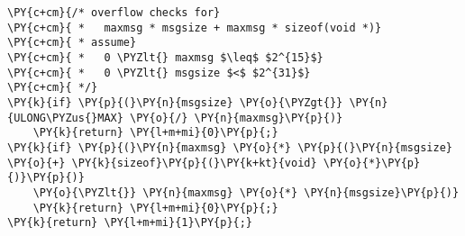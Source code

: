 \begin{Verbatim}[commandchars=\\\{\},codes={\catcode`\$=3\catcode`\^=7\catcode`\_=8}]
\PY{c+cm}{/* overflow checks for}
\PY{c+cm}{ *   maxmsg * msgsize + maxmsg * sizeof(void *)}
\PY{c+cm}{ * assume}
\PY{c+cm}{ *   0 \PYZlt{} maxmsg $\leq$ $2^{15}$}
\PY{c+cm}{ *   0 \PYZlt{} msgsize $<$ $2^{31}$}
\PY{c+cm}{ */}
\PY{k}{if} \PY{p}{(}\PY{n}{msgsize} \PY{o}{\PYZgt{}} \PY{n}{ULONG\PYZus{}MAX} \PY{o}{/} \PY{n}{maxmsg}\PY{p}{)}
    \PY{k}{return} \PY{l+m+mi}{0}\PY{p}{;}
\PY{k}{if} \PY{p}{(}\PY{n}{maxmsg} \PY{o}{*} \PY{p}{(}\PY{n}{msgsize} \PY{o}{+} \PY{k}{sizeof}\PY{p}{(}\PY{k+kt}{void} \PY{o}{*}\PY{p}{)}\PY{p}{)}
    \PY{o}{\PYZlt{}} \PY{n}{maxmsg} \PY{o}{*} \PY{n}{msgsize}\PY{p}{)}
    \PY{k}{return} \PY{l+m+mi}{0}\PY{p}{;}
\PY{k}{return} \PY{l+m+mi}{1}\PY{p}{;}
\end{Verbatim}

